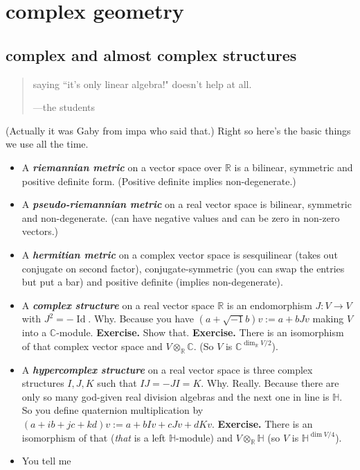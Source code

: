 \section{complex geometry}

\subsection{complex and almost complex structures}
\vspace{1em}
\begin{quotation}
saying ``it's only linear algebra!" doesn't help at all.

	\hfill ---the students
\end{quotation}
\vspace{2em}

(Actually it was Gaby from impa who said that.) Right so here's the basic things we use all the time.
\begin{itemize}
\item A \textit{\textbf{riemannian metric}} on a vector space over \(\mathbb{R}\) is a bilinear, symmetric and positive definite form. (Positive definite implies non-degenerate.)
\item A \textit{\textbf{pseudo-riemannian metric}} on a real vector space is bilinear, symmetric and non-degenerate. (can have negative values and can be zero in non-zero vectors.)
\item A \textit{\textbf{hermitian metric}} on a complex vector space is sesquilinear (takes out conjugate on second factor), conjugate-symmetric (you can swap the entries but put a bar) and positive definite (implies non-degenerate).
\item A \textit{\textbf{complex structure}} on a real vector space  \(\mathbb{R}\) is an endomorphism \(J:V \to V\) with \(J^2=-\operatorname{Id}\). Why. Because you have \((a+\sqrt{-1}b)v:=a+bJv\) making \(V\) into a \(\mathbb{C}\)-module. \textbf{Exercise.} Show that.  \textbf{Exercise.} There is an isomorphism of that complex vector space and \(V \otimes_{\mathbb{R}}\mathbb{C}\). (So \(V\) is \(\mathbb{C}^{\dim_{\mathbb{R}} V/2}\)).
\item A \textit{\textbf{hypercomplex structure}} on a real vector space is three complex structures \(I,J,K\) such that \(I J =- J I = K\). Why. Really. Because there are only so many god-given real division algebras and the next one in line is \(\mathbb{H}\). So you define quaternion multiplication by \((a+ib+jc+kd)v:=a+b Iv+c Jv + d Kv\). \textbf{Exercise.} There is an isomorphism of that (\textit{that} is a left \(\mathbb{H}\)-module) and \(V \otimes_{\mathbb{R}}\mathbb{H}\) (so \(V\) is \(\mathbb{H}^{\dim V/4}\)).
\item You tell me
\end{itemize}
